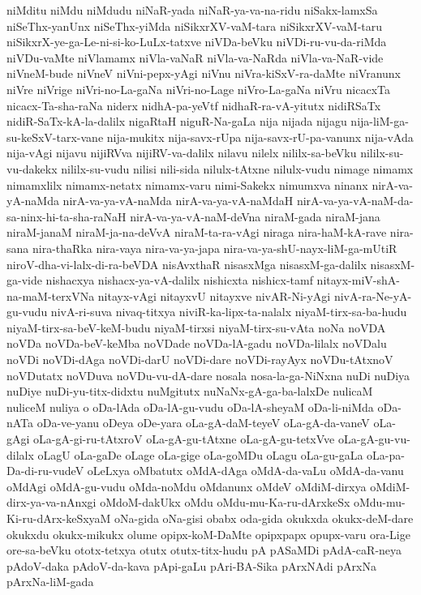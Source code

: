 {niMditu
niMdu
niMdudu
niNaR-yada
niNaR-ya-va-na-ridu
niSakx-lamxSa
niSeThx-yanUnx
niSeThx-yiMda
niSikxrXV-vaM-tara
niSikxrXV-vaM-taru
niSikxrX-ye-ga-Le-ni-si-ko-LuLx-tatxve
niVDa-beVku
niVDi-ru-vu-da-riMda
niVDu-vaMte
niVlamamx
niVla-vaNaR
niVla-va-NaRda
niVla-va-NaR-vide
niVneM-bude
niVneV
niVni-pepx-yAgi
niVnu
niVra-kiSxV-ra-daMte
niVranunx
niVre
niVrige
niVri-no-La-gaNa
niVri-no-Lage
niVro-La-gaNa
niVru
nicacxTa
nicacx-Ta-sha-raNa
niderx
nidhA-pa-yeVtf
nidhaR-ra-vA-yitutx
nidiRSaTx
nidiR-SaTx-kA-la-dalilx
nigaRtaH
niguR-Na-gaLa
nija
nijada
nijagu
nija-liM-ga-su-keSxV-tarx-vane
nija-mukitx
nija-savx-rUpa
nija-savx-rU-pa-vanunx
nija-vAda
nija-vAgi
nijavu
nijiRVva
nijiRV-va-dalilx
nilavu
nilelx
nililx-sa-beVku
nililx-su-vu-dakekx
nililx-su-vudu
nilisi
nili-sida
nilulx-tAtxne
nilulx-vudu
nimage
nimamx
nimamxlilx
nimamx-netatx
nimamx-varu
nimi-Sakekx
nimumxva
ninanx
nirA-va-yA-naMda
nirA-va-ya-vA-naMda
nirA-va-ya-vA-naMdaH
nirA-va-ya-vA-naM-da-sa-ninx-hi-ta-sha-raNaH
nirA-va-ya-vA-naM-deVna
niraM-gada
niraM-jana
niraM-janaM
niraM-ja-na-deVvA
niraM-ta-ra-vAgi
niraga
nira-haM-kA-rave
nira-sana
nira-thaRka
nira-vaya
nira-va-ya-japa
nira-va-ya-shU-nayx-liM-ga-mUtiR
niroV-dha-vi-lalx-di-ra-beVDA
nisAvxthaR
nisasxMga
nisasxM-ga-dalilx
nisasxM-ga-vide
nishacxya
nishacx-ya-vA-dalilx
nishicxta
nishicx-tamf
nitayx-miV-shA-na-maM-terxVNa
nitayx-vAgi
nitayxvU
nitayxve
nivAR-Ni-yAgi
nivA-ra-Ne-yA-gu-vudu
nivA-ri-suva
nivaq-titxya
niviR-ka-lipx-ta-nalalx
niyaM-tirx-sa-ba-hudu
niyaM-tirx-sa-beV-keM-budu
niyaM-tirxsi
niyaM-tirx-su-vAta
noNa
noVDA
noVDa
noVDa-beV-keMba
noVDade
noVDa-lA-gadu
noVDa-lilalx
noVDalu
noVDi
noVDi-dAga
noVDi-darU
noVDi-dare
noVDi-rayAyx
noVDu-tAtxnoV
noVDutatx
noVDuva
noVDu-vu-dA-dare
nosala
nosa-la-ga-NiNxna
nuDi
nuDiya
nuDiye
nuDi-yu-titx-didxtu
nuMgitutx
nuNaNx-gA-ga-ba-lalxDe
nulicaM
nuliceM
nuliya
o
oDa-lAda
oDa-lA-gu-vudu
oDa-lA-sheyaM
oDa-li-niMda
oDa-nATa
oDa-ve-yanu
oDeya
oDe-yara
oLa-gA-daM-teyeV
oLa-gA-da-vaneV
oLa-gAgi
oLa-gA-gi-ru-tAtxroV
oLa-gA-gu-tAtxne
oLa-gA-gu-tetxVve
oLa-gA-gu-vu-dilalx
oLagU
oLa-gaDe
oLage
oLa-gige
oLa-goMDu
oLagu
oLa-gu-gaLa
oLa-pa-Da-di-ru-vudeV
oLeLxya
oMbatutx
oMdA-dAga
oMdA-da-vaLu
oMdA-da-vanu
oMdAgi
oMdA-gu-vudu
oMda-noMdu
oMdanunx
oMdeV
oMdiM-dirxya
oMdiM-dirx-ya-va-nAnxgi
oMdoM-dakUkx
oMdu
oMdu-mu-Ka-ru-dArxkeSx
oMdu-mu-Ki-ru-dArx-keSxyaM
oNa-gida
oNa-gisi
obabx
oda-gida
okukxda
okukx-deM-dare
okukxdu
okukx-mikukx
olume
opipx-koM-DaMte
opipxpapx
opupx-varu
ora-Lige
ore-sa-beVku
ototx-tetxya
otutx
otutx-titx-hudu
pA
pASaMDi
pAdA-caR-neya
pAdoV-daka
pAdoV-da-kava
pApi-gaLu
pAri-BA-Sika
pArxNAdi
pArxNa
pArxNa-liM-gada
}
